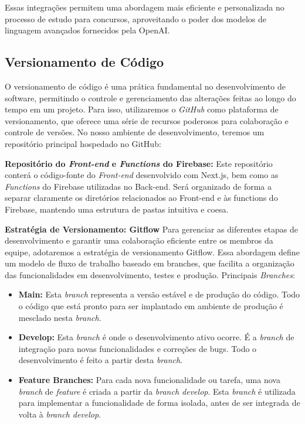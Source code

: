 Essas integrações permitem uma abordagem mais eficiente e personalizada no processo de estudo para concursos, aproveitando o poder dos modelos de linguagem avançados fornecidos pela OpenAI.

\subsection{Versionamento de Código}
O versionamento de código é uma prática fundamental no desenvolvimento de software, permitindo o controle e gerenciamento das alterações feitas ao longo do tempo em um projeto. Para isso, utilizaremos o \textit{GitHub} como plataforma de versionamento, que oferece uma série de recursos poderosos para colaboração e controle de versões. No nosso ambiente de desenvolvimento, teremos um repositório principal hospedado no GitHub:

\textbf{Repositório do \textit{Front-end} e \textit{Functions} do Firebase:} \newline
Este repositório conterá o código-fonte do \textit{Front-end} desenvolvido com Next.js, bem como as \textit{Functions} do Firebase utilizadas no Back-end. Será organizado de forma a separar claramente os diretórios relacionados ao Front-end e às functions do Firebase, mantendo uma estrutura de pastas intuitiva e coesa.

\textbf{Estratégia de Versionamento: Gitflow} \newline
Para gerenciar as diferentes etapas de desenvolvimento e garantir uma colaboração eficiente entre os membros da equipe, adotaremos a estratégia de versionamento Gitflow. Essa abordagem define um modelo de fluxo de trabalho baseado em branches, que facilita a organização das funcionalidades em desenvolvimento, testes e produção.
Principais \textit{Branches}:

\begin{itemize}
\item \textbf{Main:} Esta \textit{branch} representa a versão estável e de produção do código. Todo o código que está pronto para ser implantado em ambiente de produção é mesclado nesta \textit{branch}.

\item \textbf{Develop:} Esta \textit{branch} é onde o desenvolvimento ativo ocorre. É a \textit{branch} de integração para novas funcionalidades e correções de bugs. Todo o desenvolvimento é feito a partir desta \textit{branch}.

\item \textbf{Feature Branches:} Para cada nova funcionalidade ou tarefa, uma nova \textit{branch} de \textit{feature} é criada a partir da \textit{branch develop}. Esta \textit{branch} é utilizada para implementar a funcionalidade de forma isolada, antes de ser integrada de volta à \textit{branch develop}.
\end{itemize}
 
